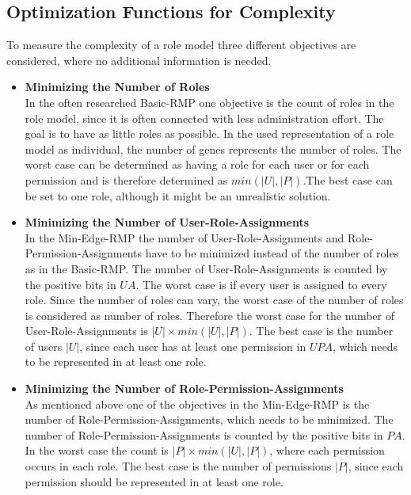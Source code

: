         \subsection{Optimization Functions for Complexity}
        \label{sec:optimizationComplexity}
        To measure the complexity of a role model three different objectives are considered, where no additional information is needed.
        \begin{itemize}
            \item \textbf{Minimizing the Number of Roles}\\
            In the often researched Basic-RMP one objective is the count of roles in the role model, since it is often connected with less administration effort. The goal is to have as little roles as possible. In the used representation of a role model as individual, the number of genes represents the number of roles. The worst case can be determined as having a role for each user or for each permission and is therefore determined as $min(|U|,|P|)$.The best case can be set to one role, although it might be an unrealistic solution.
            \item \textbf{Minimizing the Number of User-Role-Assignments}\\
            In the Min-Edge-RMP the number of User-Role-Assignments and Role-Permission-Assignments have to be minimized instead of the number of roles as in the Basic-RMP. The number of User-Role-Assignments is counted by the positive bits in $UA$. The worst case is if every user is assigned to every role. Since the number of roles can vary, the worst case of the number of roles is considered as number of roles. Therefore the worst case for the number of User-Role-Assignments is $|U| \times min(|U|,|P|)$. The best case is the number of users $|U|$, since each user has at least one permission in $UPA$, which needs to be represented in at least one role.
            \item \textbf{Minimizing the Number of Role-Permission-Assignments}\\
            As mentioned above one of the objectives in the Min-Edge-RMP is the number of Role-Permission-Assignments, which needs to be minimized. The number of Role-Permission-Assignments is counted by the positive bits in $PA$. In the worst case the count is $|P| \times min(|U|,|P|)$, where each permission occurs in each role. The best case is the number of permissions $|P|$, since each permission should be represented in at least one role.
        \end{itemize}
